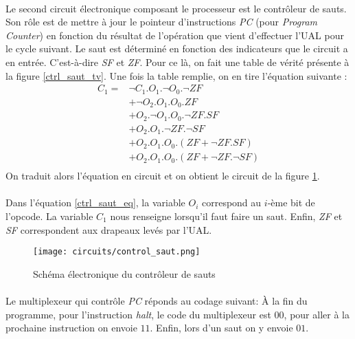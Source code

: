 \paragraph{}{
	Le second circuit électronique composant le processeur est
	le contrôleur de sauts. Son rôle est de mettre à jour le pointeur
	d'instructions \textit{PC} (pour \textit{Program Counter})
	en fonction du résultat de l'opération que vient d'effectuer
	l'UAL pour le cycle suivant. Le saut est déterminé en fonction
	des indicateurs que le circuit a en entrée. C'est-à-dire 
	\textit{SF} et \textit{ZF}. Pour ce là, on fait une table de
	vérité présente à la figure \ref{ctrl_saut_tv}. Une 
	fois la	table remplie, on en tire l'équation suivante :
	\begin{equation}
		\label{ctrl_saut_eq}
		\begin{split}
		C_{1} = & \neg C_{1} . O_{1} . \neg O_{0} . \neg{ZF} \\
				& + \neg O_{2} . O_{1} . O_{0} .  {ZF} \\
				& + O_{2} . \neg O_{1} . O_{0} . \neg{ZF} . {SF} \\
				& + O_{2} . O_{1} . \neg{ZF} . \neg{SF} \\
				& + O_{2} . O_{1} . O_{0} . ( {ZF} + \neg{ZF} . {SF}) \\
				& + O_{2} . O_{1} . O_{0} . ( {ZF} + \neg{ZF} . \neg{SF} ) \\
		\end{split}
	\end{equation}
	On traduit alors l'équation en circuit et on obtient le circuit
	de la figure \ref{control_saut_circ}.
}

\paragraph{}{
	Dans l'équation \ref{ctrl_saut_eq}, la variable $O_{i}$ correspond au $i$-ème
	bit de l'opcode. La variable $C_{1}$ nous renseigne lorsqu'il faut faire un saut.
	Enfin, \textit{ZF} et \textit{SF} correspondent aux drapeaux levés par l'UAL.
}

\begin{figure}[!ht]
	\centering
	\texttt{[image: circuits/control\_saut.png]}
	\caption{
		\label{control_saut_circ}
		Sch\'{e}ma \'{e}lectronique du contr\^{o}leur de sauts
	}
\end{figure}

\paragraph{}{
	Le multiplexeur qui contrôle \textit{PC} réponds au codage suivant:
	À la fin du programme, pour l'instruction \textit{halt}, le code du
	multiplexeur est $00$, pour aller à la prochaine instruction on envoie
	$11$. Enfin, lors d'un saut on y envoie $01$.
}

